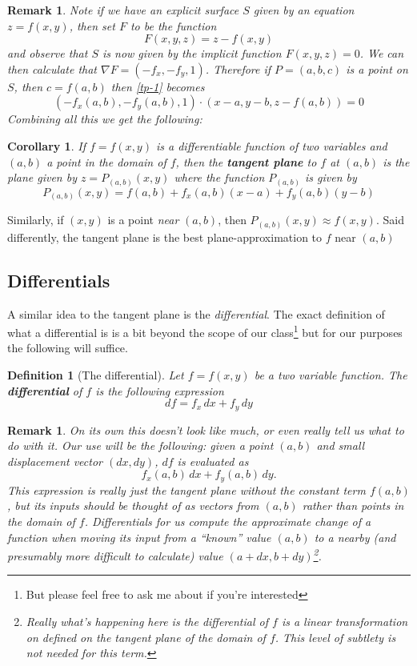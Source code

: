 \documentclass[12pt]{article}
\numberwithin{equation}{subsection}
\numberwithin{figure}{subsection}
\newtheorem{defn}[subsection]{Definition}
\newtheorem{corr}[subsection]{Corollary}
\theoremstyle{note}
\newtheorem{remark}[subsection]{Remark}
\begin{document}
{\begin{remark}Note if we have an \textit{explicit surface} $S$ given by an equation $z=f(x,y)$, then set $F$ to be the function \[F(x,y,z)=z-f(x,y)\] and observe that $S$ is now given by the implicit function $F(x,y,z)=0$. We can then calculate that $\nabla F=(-f_x, -f_y, 1)$.  Therefore if $P=(a,b,c)$ is a point on $S$, then $c=f(a,b)$ then \eqref{tp-1} becomes \[ (-f_x(a,b),-f_y(a,b),1)\cdot (x-a, y-b,z-f(a,b))=0\] Combining all this we get the following: \end{remark}

\begin{corr} If $f=f(x,y)$ is a differentiable function of two variables and $(a,b)$ a point in the domain of $f$, then the \textbf{tangent plane} to $f$ at $(a,b)$ is the plane given by $z=P_{(a,b)}(x,y)$ where the function $P_{(a,b)}$ is given by \begin{equation} \label{tp-2} P_{(a,b)}(x,y)=f(a,b)+f_x(a,b)(x-a)+f_y(a,b)(y-b)\end{equation}
\end{corr}

Similarly, if $(x,y)$ is a point \textit{near} $(a,b)$, then $P_{(a,b)}(x,y)\approx f(x,y)$. Said differently, the tangent plane is the best plane-approximation to $f$ near $(a,b)$

\subsection{Differentials}
A similar idea to the tangent plane is the \textit{differential}. The exact definition of what a differential is is a bit beyond the scope of our class\footnote{But please feel free to ask me about if you're interested} but for our purposes the following will suffice.

\begin{defn}[The differential] Let $f=f(x,y)$ be a two variable function. The \textbf{differential} of $f$ is the following expression \begin{equation} \label{diff} df=f_x \,dx+f_y \,dy \end{equation}
\end{defn}

\begin{remark}On its own this doesn't look like much, or even really tell us what to do with it. Our use will be the following: given a point $(a,b)$ and small displacement vector $(d x, d y)$, $df$ is evaluated as \[f_x(a,b)\, d x+f_y(a,b) \, d y.\] This expression is really just the tangent plane without the constant term $f(a,b)$, but its inputs should be thought of as vectors from $(a,b)$ rather than points in the domain of $f$. Differentials for us compute the \textit{approximate change} of a function when moving its input from a ``known'' value $(a,b)$ to a nearby (and presumably more difficult to calculate) value $(a+d x, b+d y)$\footnote{Really what's happening here is the differential of $f$ is a \textit{linear transformation} on defined on the tangent plane of the domain of $f$. This level of subtlety is not needed for this term. }. 
\end{remark}

}
\end{document}
